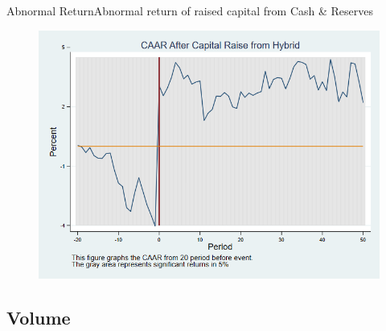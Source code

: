 \documentclass{beamer}
\begin{document}
\begin{frame}{Abnormal Return}{Abnormal return of raised capital from Cash \& Reserves}
\label{abreturnhybrid}
\begin{figure}
\centering
\includegraphics[width=0.65\linewidth]{Output/CARHybrid.png}
\label{fig:abreturnhybrid}
\end{figure}
\hfill\hyperlink{abreturnhybrid4Factor}{}
\end{frame}


%
%
%
%
%
%
%
%
%

\subsection{Volume}
\end{document}

